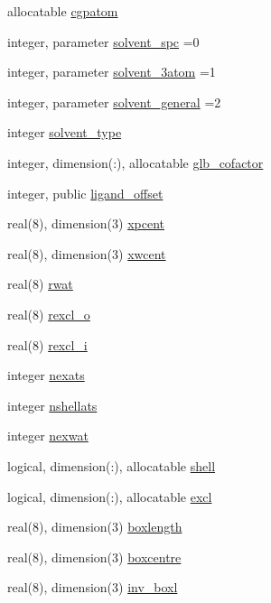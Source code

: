 \begin{DoxyCompactItemize}
allocatable \hyperlink{classtopo_aaa0378f603bebaa45a7aaa20adf7a881}{cgpatom}
\item 
integer, parameter \hyperlink{classtopo_a511570d6a5e9c6eef152d18f793f51ad}{solvent\-\_\-spc} =0
\item 
integer, parameter \hyperlink{classtopo_adfbe1f0059a125762d2f0be3ad7899f1}{solvent\-\_\-3atom} =1
\item 
integer, parameter \hyperlink{classtopo_ac2cd61b970ce97de005f36f91d23aa29}{solvent\-\_\-general} =2
\item 
integer \hyperlink{classtopo_a6e2eb29b8d19028c7ee9ba06b64359ad}{solvent\-\_\-type}
\item 
integer, dimension(\-:), allocatable \hyperlink{classtopo_a0c4a7c684dc6cb8009204fa4ff5a415b}{glb\-\_\-cofactor}
\item 
integer, public \hyperlink{classtopo_a8ea821d57105dc97b563aefc43d99d60}{ligand\-\_\-offset}
\item 
real(8), dimension(3) \hyperlink{classtopo_a05520e487814783f2383d15af85fa9b0}{xpcent}
\item 
real(8), dimension(3) \hyperlink{classtopo_a6d9dae4d1a043949c4aaed1b7e605fb1}{xwcent}
\item 
real(8) \hyperlink{classtopo_a5afc147998793fe81dc80f71d620b250}{rwat}
\item 
real(8) \hyperlink{classtopo_a4366d13c72ff459b53a9d5d4bfa3fbf1}{rexcl\-\_\-o}
\item 
real(8) \hyperlink{classtopo_a620b9479ac6c966db149f0c9e0724c33}{rexcl\-\_\-i}
\item 
integer \hyperlink{classtopo_ac511fe2f83b9f7f217045c167ea69a73}{nexats}
\item 
integer \hyperlink{classtopo_aab63f01b0844c9dd5b6c57b7257825d7}{nshellats}
\item 
integer \hyperlink{classtopo_ade6597c2219c875b950e07384990ac20}{nexwat}
\item 
logical, dimension(\-:), allocatable \hyperlink{classtopo_acb17ff02ccc726e439feaad37738f222}{shell}
\item 
logical, dimension(\-:), allocatable \hyperlink{classtopo_a9ef86d62501c5cd833dee346e02d324c}{excl}
\item 
real(8), dimension(3) \hyperlink{classtopo_a17297954a20e0e493e7c6415823fc312}{boxlength}
\item 
real(8), dimension(3) \hyperlink{classtopo_a352c64cb90d5b00eea0402dc6954e595}{boxcentre}
\item 
real(8), dimension(3) \hyperlink{classtopo_ad55ddb5451fe2a4663e4e0b8bd9d3962}{inv\-\_\-boxl}

\end{DoxyCompactItemize}
